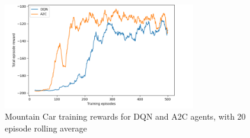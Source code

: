 \begin{figure}[H]
  \centering
  \includegraphics[width=0.75\textwidth]{figures/images/mountain_car_rewards.png}
  \caption[Mountain Car training rewards]{Mountain Car training rewards for DQN and A2C agents, with 20 episode rolling average}
  \label{fig:mountain_car_rewards}
\end{figure}
